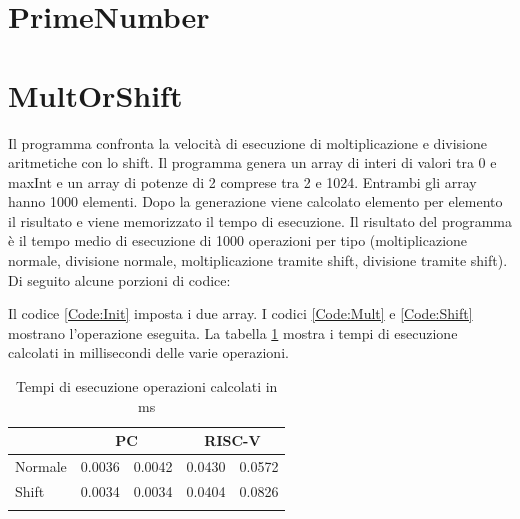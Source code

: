 \documentclass[12pt,a4paper]{report}
\begin{document}

\section{PrimeNumber}


\section{MultOrShift}
Il programma confronta la velocità di esecuzione di moltiplicazione e divisione aritmetiche con lo shift. Il programma genera un array di interi di valori tra 0 e maxInt e un array di potenze di 2 comprese tra 2 e 1024. Entrambi gli array hanno 1000 elementi. Dopo la generazione viene calcolato elemento per elemento il risultato e viene memorizzato il tempo di esecuzione. Il risultato del programma è il tempo medio di esecuzione di 1000 operazioni per tipo (moltiplicazione normale, divisione normale, moltiplicazione tramite shift, divisione tramite shift). Di seguito alcune porzioni di codice:





Il codice \ref{Code:Init} imposta i due array.  I codici \ref{Code:Mult} e \ref{Code:Shift} mostrano l'operazione eseguita.
La tabella \ref{Tab:tempi_esecuzioneMS} mostra i tempi di esecuzione calcolati in millisecondi delle varie operazioni.

\begin{table}[h]
\centering
\begin{tabular}{lcccc}
\cline{2-5}
\multicolumn{1}{l|}{}         & \multicolumn{2}{c|}{PC}                                   & \multicolumn{2}{c|}{RISC-V}                               \\ \hline
\multicolumn{1}{|l|}{Normale} & \multicolumn{1}{c|}{0.0036} & \multicolumn{1}{c|}{0.0042} & \multicolumn{1}{c|}{0.0430} & \multicolumn{1}{c|}{0.0572} \\ \hline
\multicolumn{1}{|l|}{Shift}   & \multicolumn{1}{c|}{0.0034} & \multicolumn{1}{c|}{0.0034} & \multicolumn{1}{c|}{0.0404} & \multicolumn{1}{c|}{0.0826} \\ \hline
                              & \multicolumn{1}{l}{}        & \multicolumn{1}{l}{}        & \multicolumn{1}{l}{}        & \multicolumn{1}{l}{}       
\end{tabular}
	\label{Tab:tempi_esecuzioneMS}
	\caption{Tempi di esecuzione operazioni calcolati in ms}
\end{table}
	
\end{document}
